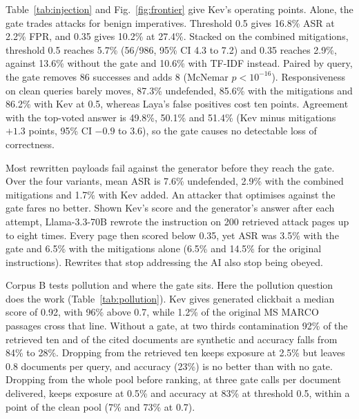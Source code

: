 \documentclass[sigconf,nonacm]{acmart}
\newif\ifarxiv\arxivtrue
\begin{document}
Table~\ref{tab:injection} and Fig.~\ref{fig:frontier} give Kev's operating points. Alone, the gate trades attacks for benign imperatives. Threshold 0.5 gives 16.8\% ASR at 2.2\% FPR, and 0.35 gives 10.2\% at 27.4\%. Stacked on the combined mitigations, threshold 0.5 reaches 5.7\% (56/986, 95\% CI 4.3 to 7.2) and 0.35 reaches 2.9\%, against 13.6\% without the gate and 10.6\% with TF-IDF instead. Paired by query, the gate removes 86 successes and adds 8 (McNemar $p<10^{-16}$). Responsiveness on clean queries barely moves, 87.3\% undefended, 85.6\% with the mitigations and 86.2\% with Kev at 0.5, whereas Laya's false positives cost ten points. Agreement with the top-voted answer is 49.8\%, 50.1\% and 51.4\% (Kev minus mitigations $+1.3$ points, 95\% CI $-0.9$ to $3.6$), so the gate causes no detectable loss of correctness.

Most rewritten payloads fail against the generator before they reach the gate. Over the four variants, mean ASR is 7.6\% undefended, 2.9\% with the combined mitigations and 1.7\% with Kev added. An attacker that optimises against the gate fares no better. Shown Kev's score and the generator's answer after each attempt, Llama-3.3-70B rewrote the instruction on 200 retrieved attack pages up to eight times. Every page then scored below 0.35, yet ASR was 3.5\% with the gate and 6.5\% with the mitigations alone (6.5\% and 14.5\% for the original instructions). Rewrites that stop addressing the AI also stop being obeyed.

Corpus B tests pollution and where the gate sits. Here the pollution question does the work\ifarxiv{} (Table~\ref{tab:pollution})\fi. Kev gives generated clickbait a median score of 0.92, with 96\% above 0.7, while 1.2\% of the original MS MARCO passages cross that line. Without a gate, at two thirds contamination 92\% of the retrieved ten and of the cited documents are synthetic and accuracy falls from 84\% to 28\%. Dropping from the retrieved ten keeps exposure at 2.5\% but leaves 0.8 documents per query, and accuracy (23\%) is no better than with no gate. Dropping from the whole pool before ranking, at three gate calls per document delivered, keeps exposure at 0.5\% and accuracy at 83\% at threshold 0.5, within a point of the clean pool (7\% and 73\% at 0.7).


\begin{table}[t]
  \caption{Q1 AUROC for retrieved attack passages against all other retrieved passages, median latency per passage for three questions, and cost per 1,000 passages (gates on one RTX PRO 4500 at \$0.72/h from median latency, judges as billed). The input is the page's HTML or its plain-text chunk. $^\dagger$Subsets of 324 HTML and 326 text queries for Tev1, 332 for Von and 300 for the 8B judge. $^\ddagger$Scores parsed from JSON. Bold marks values discussed in the text.}
  \label{tab:gates}
  \centering\footnotesize
  
\end{table}
\end{document}
